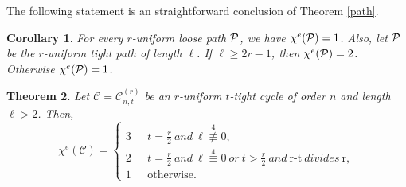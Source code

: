 \documentclass[12pt,a4paper]{article}
\newtheorem{theorem}{\bf Theorem}[section]
\newtheorem{cor}[theorem]{\bf Corollary}
\begin{document}
The following statement is an straightforward conclusion of Theorem \ref{path}.
\begin{cor}
	For every $ r$-uniform loose path $ \cal P $, we have $  \chi^e({\cal P})=1 $.
	Also, let $ \cal P $ be the $ r$-uniform tight path of length $ \ell $. If $ \ell\geq 2r-1 $, then $  \chi^e({\cal P})=2 $. Otherwise $  \chi^e({\cal P})=1 $.
\end{cor}

\begin{theorem}\label{cycle}
	Let $\mathcal{C}=\mathcal{C}_{n,t}^{(r)} $ be an $ r$-uniform $ t$-tight cycle of order $n$ and  length $ \ell>2 $. Then,
	\begin{equation*}
	\chi^{e}(\mathcal{C})=
	\left\{
	\begin{array}{cl}
	3 & \ \ \ t=\frac{r}{2}\ and\  \ell\overset{4}{\not\equiv}0,\\
	2 & \ \ \ t=\frac{r}{2}\ and\  \ell\overset{4}{\equiv}0\  or\  t>\frac{r}{2}\ and\  \text{r-t}\  divides \  \text{r},\\
	1 & \ \ \ \text{otherwise.}
	\end{array}
	\right.
	\end{equation*}
\end{theorem}
\end{document}
